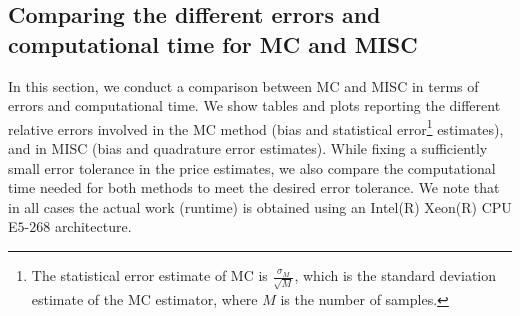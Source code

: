 %	
%
%
\FloatBarrier


\subsection{Comparing the different  errors and computational time for MC and MISC}\label{sec:Comparing different  errors and complexity for MC and MISC}
In this section, we conduct a comparison between MC and MISC in terms of errors and computational time. We show tables and plots reporting  the different relative errors involved in the MC method (bias and statistical error\footnote{The statistical error estimate of MC is  $\frac{\sigma_M}{\sqrt{M}}$, which is the standard deviation estimate of the MC estimator,  where $M$ is the number of samples.}  estimates), and in MISC (bias and quadrature error estimates).  While fixing  a  sufficiently small error tolerance in the price estimates,  we also compare the computational time needed for both methods to meet the desired error tolerance.  We note that  in all cases the actual work (runtime) is obtained using an Intel(R) Xeon(R) CPU E$5$-$268$ architecture. 

